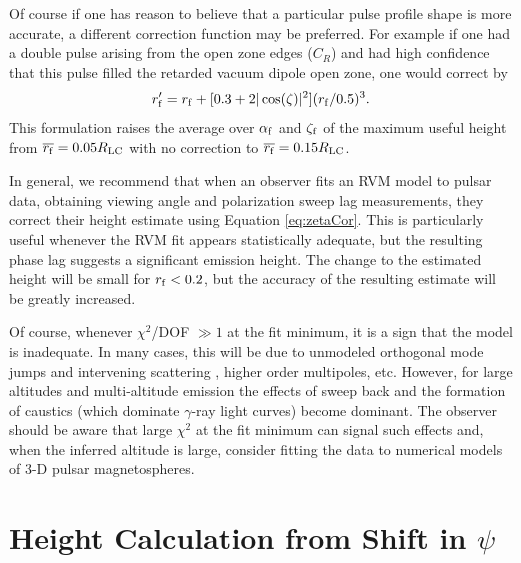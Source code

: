 	Of course if one has reason to believe that a particular pulse 
profile shape is more accurate, a different correction function may be
preferred. For example if one had a double pulse arising from the open zone edges ($C_R$) and
had high confidence that this pulse filled the retarded vacuum dipole open
zone, one would correct by
\begin{equation}\label{eq:zetaCor2}
r_{\rm{f}}' = r_{\rm{f}}+ [0.3 +2 |\cos(\zeta)|^{2} ] (r_{\rm{f}}/0.5)^{3}.
\end{equation}
This formulation raises the average over $\alpha_{\rm{f}}$ and $\zeta_{\rm{f}}$ of
the maximum useful height from $\overline{r_{\rm f}}=0.05R_{\rm{LC}}$ with no correction to 
$\overline{r_{\rm{f}}}=0.15R_{\rm{LC}}$.

	In general, we recommend that when an observer fits an RVM model to pulsar
data, obtaining viewing angle and polarization sweep lag measurements,
they correct their height estimate using Equation \ref{eq:zetaCor}.  This is 
particularly useful whenever the RVM fit appears statistically adequate,
but the resulting phase lag suggests a significant emission height.
The change to the estimated height will be small for $r_{\rm{f}} < 0.2$,
but the accuracy of the resulting estimate will be greatly increased.

	Of course, whenever $\chi^2$/DOF $\gg1$ at the fit minimum, it is a sign
that the model is inadequate. In many cases, this will be due to 
unmodeled orthogonal mode jumps and intervening scattering \citep{karastergiou2009complex},
higher order multipoles, etc. However, for large altitudes and
multi-altitude emission the effects of sweep back and the formation
of caustics (which dominate $\gamma$-ray light curves) become dominant.
The observer should be aware that large $\chi^2$ at the fit minimum
can signal such effects and, when the inferred altitude is large, consider 
fitting the data to numerical models of 3-D pulsar magnetospheres.

\section{Height Calculation from Shift in $\psi$}
\label{sec:heightFromPsi}

